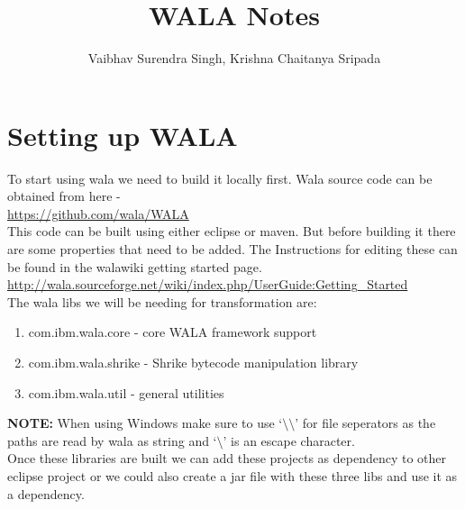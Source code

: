 \documentclass[11pt,psfig,a4]{article}
\begin{document}
 
\pagestyle{plain} 

\title{WALA Notes\\}
\author{Vaibhav Surendra Singh, Krishna Chaitanya Sripada}
\maketitle

\section{Setting up WALA}
\begin{flushleft}
To start using wala we need to build it locally first. Wala source code can be obtained from here - \\
\url{https://github.com/wala/WALA}\\
\vspace{0.5em}
This code can be built using either eclipse or maven. But before building it there are some properties that need to be added. The Instructions for editing these can be found in the walawiki getting started page.\\
\url{http://wala.sourceforge.net/wiki/index.php/UserGuide:Getting_Started}\\
\vspace{0.5em}
The wala libs we will be needing for transformation are:\\
\begin{enumerate}
\item com.ibm.wala.core - core WALA framework support
\item com.ibm.wala.shrike - Shrike bytecode manipulation library
\item com.ibm.wala.util - general utilities
\end{enumerate}
\textbf{NOTE:} When using Windows make sure to use `$\setminus \setminus$' for file seperators as the paths are read by wala as string and `$\setminus$' is an escape character.\\
Once these libraries are built we can add these projects as dependency to other eclipse project or we could also create a jar file with these three libs and use it as a dependency.\\
\end{flushleft}
\end{document}

